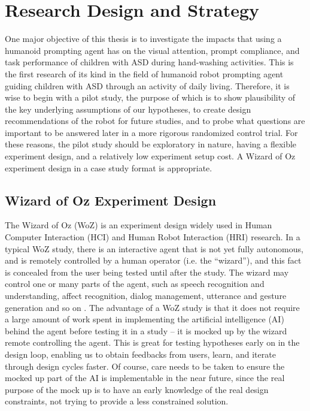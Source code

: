 \section{Research Design and Strategy}
One major objective of this thesis is to investigate the impacts that using a humanoid prompting agent has on the visual attention, prompt compliance, and task performance of children with ASD during hand-washing activities.  This is the first research of its kind in the field of humanoid robot prompting agent guiding children with ASD through an activity of daily living.  Therefore, it is wise to begin with a pilot study, the purpose of which is to show plausibility of the key underlying assumptions of our hypotheses, to create design recommendations of the robot for future studies, and to probe what questions are important to be answered later in a more rigorous randomized control trial.  For these reasons, the pilot study should be exploratory in nature, having a flexible experiment design, and a relatively low experiment setup cost.  A Wizard of Oz experiment design in a case study format is appropriate.

\subsection{Wizard of Oz Experiment Design}
The Wizard of Oz (WoZ) is an experiment design widely used in Human Computer Interaction (HCI) and Human Robot Interaction (HRI) research.  In a typical WoZ study, there is an interactive agent that is not yet fully autonomous, and is remotely controlled by a human operator (i.e. the ``wizard''), and this fact is concealed from the user being tested until after the study.  The wizard may control one or many parts of the agent, such as speech recognition and understanding, affect recognition, dialog management, utterance and gesture generation and so on \cite{bhargava2013demonstration}.  The advantage of a WoZ study is that it does not require a large amount of work spent in implementing the artificial intelligence (AI) behind the agent before testing it in a study -- it is mocked up by the wizard remote controlling the agent.  This is great for testing hypotheses early on in the design loop, enabling us to obtain feedbacks from users, learn, and iterate through design cycles faster.  Of course, care needs to be taken to ensure the mocked up part of the AI is implementable in the near future, since the real purpose of the mock up is to have an early knowledge of the real design constraints, not trying to provide a less constrained solution.

